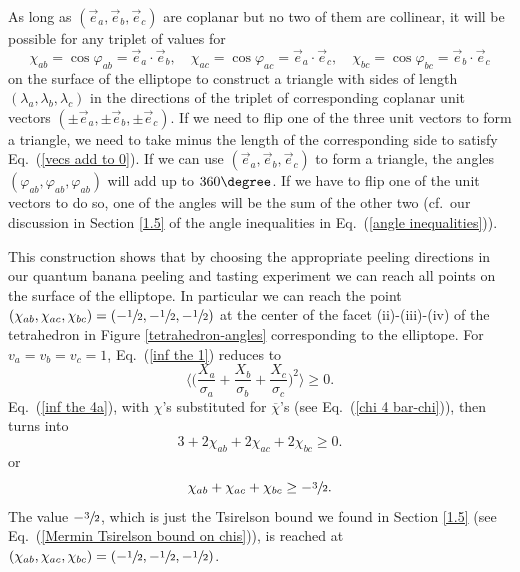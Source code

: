 As long as $(\vec{e}_a, \vec{e}_b, \vec{e}_c)$ are coplanar but no two of them are collinear, it will be possible for any triplet of values for 
\begin{equation}
\chi_{ab} = \cos{\varphi_{ab}} =  \vec{e}_a \! \cdot  \vec{e}_b, \quad \chi_{ac} =    \cos{\varphi_{ac}} =   \vec{e}_a \! \cdot \vec{e}_c, \quad \chi_{bc} =    \cos{\varphi_{bc}} \! = \!  \vec{e}_b \! \cdot \vec{e}_c
\label{chi's as inner prods of e's}
\end{equation}
on the surface of the elliptope to construct a triangle with sides of length $(\lambda_a, \lambda_b, \lambda_c)$ in the directions of the triplet of corresponding coplanar unit vectors $(\pm \vec{e}_a, \pm \vec{e}_b, \pm \vec{e}_c)$. If we need to flip one of the three unit vectors to form a triangle, we need to take minus the length of the corresponding side to satisfy Eq.\ (\ref{vecs add to 0}). If we can use $(\vec{e}_a, \vec{e}_b, \vec{e}_c)$ to form a triangle, the angles $(\varphi_{ab}, \varphi_{ab}, \varphi_{ab})$ will add up to $360\degree$. If we have to flip one of the unit vectors to do so, one of the angles will be the sum of the other two (cf.\ our discussion in Section \ref{1.5} of the angle inequalities in Eq.\ (\ref{angle inequalities})).  

This construction shows that by choosing the appropriate peeling directions in our quantum banana peeling and tasting experiment we can reach all points on the surface of the elliptope. In particular we can reach the point $(\chi_{ab}, \chi_{ac}, \chi_{bc}) = (-\sfrac12, -\sfrac12, -\sfrac12)$ at the center of the facet (ii)-(iii)-(iv) of the tetrahedron in Figure \ref{tetrahedron-angles} corresponding to the elliptope. For $v_a = v_b = v_c = 1$, Eq.\ (\ref{inf the 1}) reduces to 
\begin{equation}
\Big\langle \Big(  \frac{X_a}{\sigma_a} +  \frac{X_b}{\sigma_b} + \frac{X_c}{\sigma_c} \Big)^{\!2} \Big\rangle \ge 0.
\label{Tsirelson reprise 1}
\end{equation}
Eq.\ (\ref{inf the 4a}), with $\chi$'s substituted for $\overline{\chi}$'s (see Eq.\ (\ref{chi 4 bar-chi})), then turns into
\begin{equation}
3 + 2 \chi_{ab} + 2 \chi_{ac}  +  2 \chi_{bc} \ge 0.
\label{Tsirelson reprise 2}
\end{equation}
or
\begin{equation}
\chi_{ab} + \chi_{ac}  +  \chi_{bc} \ge -\sfrac32.
\label{Tsirelson reprise 3}
\end{equation}
The value $-\sfrac32$, which is just the Tsirelson bound we found in Section \ref{1.5} (see Eq.\ (\ref{Mermin Tsirelson bound on chis})), is reached at $(\chi_{ab}, \chi_{ac}, \chi_{bc}) = (-\sfrac12, -\sfrac12, -\sfrac12)$.

